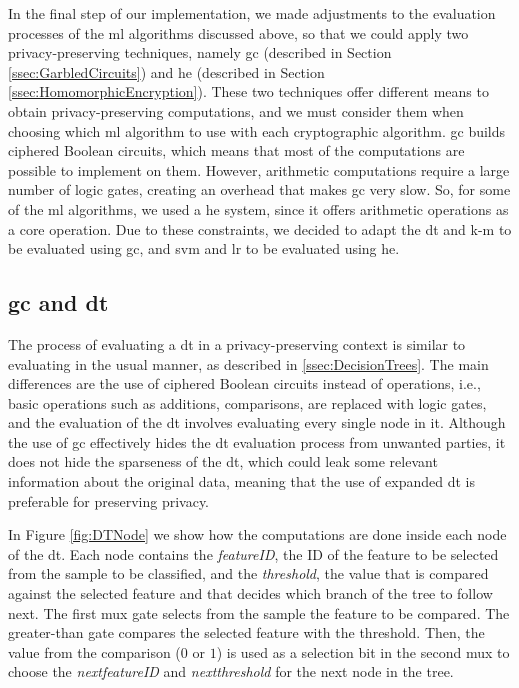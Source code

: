 In the final step of our implementation, we made adjustments to the evaluation processes of the \ac{ml} algorithms discussed above, so that we could apply two privacy-preserving techniques, namely \ac{gc} (described in Section \ref{ssec:GarbledCircuits}) and \ac{he} (described in Section \ref{ssec:HomomorphicEncryption}).
These two techniques offer different means to obtain privacy-preserving computations, and we must consider them when choosing which \ac{ml} algorithm to use with each cryptographic algorithm. \ac{gc} builds ciphered Boolean circuits, which means that most of the computations are possible to implement on them. However, arithmetic computations require a large number of logic gates, creating an overhead that makes \ac{gc} very slow. So, for some of the \ac{ml} algorithms, we used a \ac{he} system, since it offers arithmetic operations as a core operation. Due to these constraints, we decided to adapt the \ac{dt} and \ac{k-m} to be evaluated using \ac{gc}, and \ac{svm} and \ac{lr} to be evaluated using \ac{he}.


\subsection{\acl{gc} and \acl{dt}}
\label{ssec:GCandDT}

The process of evaluating a \ac{dt} in a privacy-preserving context is similar to evaluating in the usual manner, as described in \ref{ssec:DecisionTrees}. The main differences are the use of ciphered Boolean circuits instead of operations, i.e., basic operations such as additions, comparisons, are replaced with logic gates, and the evaluation of the \ac{dt} involves evaluating every single node in it. Although the use of \ac{gc} effectively hides the \ac{dt} evaluation process from unwanted parties, it does not hide the sparseness of the \ac{dt}, which could leak some relevant information about the original data, meaning that the use of expanded \ac{dt} is preferable for preserving privacy.


In Figure \ref{fig:DTNode} we show how the computations are done inside each node of the \ac{dt}. Each node contains the \textit{featureID}, the ID of the feature to be selected from the sample to be classified, and the \textit{threshold}, the value that is compared against the selected feature and that decides which branch of the tree to follow next. The first \ac{mux} gate selects from the sample the feature to be compared. The greater-than gate compares the selected feature with the threshold. Then, the value from the comparison ($0$ or $1$) is used as a selection bit in the second \ac{mux} to choose the \textit{next\textunderscore featureID} and \textit{next\textunderscore threshold} for the next node in the tree. 


